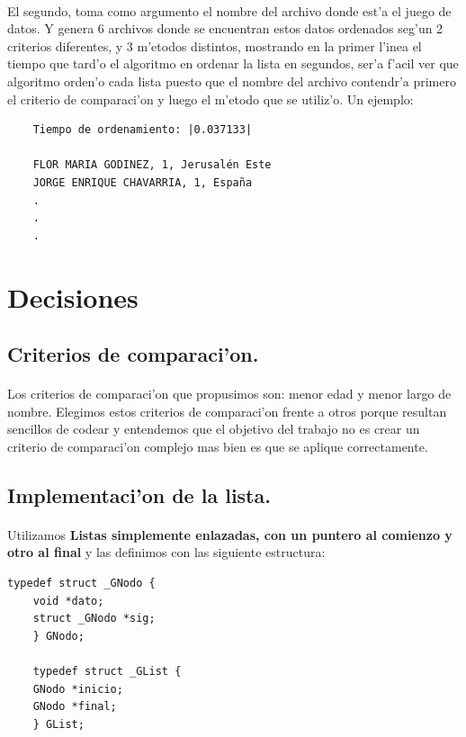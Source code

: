 \documentclass{article}
\begin{document}
	\paragraph{}
	El segundo, toma como argumento el nombre del archivo donde est'a el juego de datos. Y genera 6 archivos donde se encuentran estos datos ordenados seg'un 2 criterios diferentes, y 3 m'etodos distintos, mostrando en la primer l'inea el tiempo que tard'o el algoritmo en ordenar la lista en segundos, ser'a f'acil ver que algoritmo orden'o cada lista puesto que el nombre del archivo contendr'a primero el criterio de comparaci'on y luego el m'etodo que se utiliz'o. Un ejemplo:
	\begin{verbatim}
	Tiempo de ordenamiento: |0.037133|
	
	FLOR MARIA GODINEZ, 1, Jerusalén Este
	JORGE ENRIQUE CHAVARRIA, 1, España
	.
	.
	.
	\end{verbatim}
	\section{Decisiones}
	\subsection{Criterios de comparaci'on.}
	\paragraph{}
	Los criterios de comparaci'on que propusimos son: menor edad y menor largo de nombre. Elegimos estos criterios de comparaci'on frente a otros porque resultan sencillos de codear y entendemos que el objetivo del trabajo no es crear un criterio de comparaci'on complejo mas bien es que se aplique correctamente.
	
	\subsection{Implementaci'on de la lista.}
	\paragraph{}
	Utilizamos \textbf{Listas simplemente enlazadas, con un puntero al comienzo y otro al final} y las definimos con las siguiente estructura:
	\begin{lstlisting}[style=CStyle]
	typedef struct _GNodo {
	void *dato;
	struct _GNodo *sig;
	} GNodo;
	
	typedef struct _GList {
	GNodo *inicio;
	GNodo *final;
	} GList;	
	\end{lstlisting}
\end{document}

